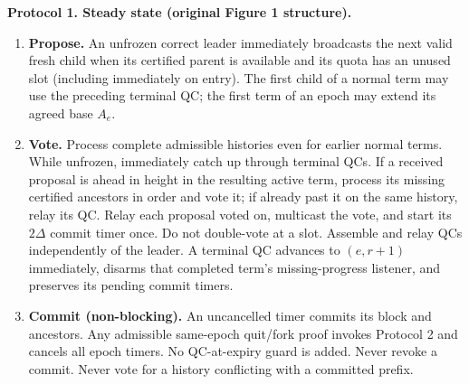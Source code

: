 \documentclass[10pt,a4paper]{article}
\newcommand{\chg}[1]{\textcolor{red!70!black}{#1}}
\begin{document}
\begin{mdframed}[linewidth=.6pt,innertopmargin=5pt,innerbottommargin=5pt]
\textbf{Protocol 1. Steady state (original Figure 1 structure).}
\begin{enumerate}[label=\textbf{\arabic*.},itemsep=3pt]
\item \textbf{Propose.} An unfrozen correct leader immediately broadcasts the next
valid fresh child when its certified parent is available and its quota
has an unused slot (including immediately on entry). \chg{The first child of a normal term may use the preceding
terminal QC; the first term of an epoch may extend its agreed base $A_e$.}
\item \textbf{Vote.} Process complete admissible histories even for earlier
normal terms. \chg{While unfrozen, immediately catch up through terminal QCs.
If a received proposal is ahead in height in the resulting active term,
process its missing certified ancestors in order and vote it; if already
past it on the same history, relay its QC.} Relay each proposal voted on,
multicast the vote, and start its $2\Delta$ commit timer once. Do not double-vote
at a slot. Assemble and relay QCs independently of the leader.
\chg{A terminal QC advances to $(e,r+1)$ immediately, disarms that completed
term's missing-progress listener, and preserves its pending commit timers.}
\item \textbf{Commit (non-blocking).} An uncancelled timer commits its block
and ancestors. \chg{Any admissible same-epoch quit/fork proof invokes Protocol 2
and cancels all epoch timers.} No QC-at-expiry guard is added. Never revoke
a commit. Never vote for a history conflicting with a committed prefix.
\end{enumerate}
\end{mdframed}
\end{document}
